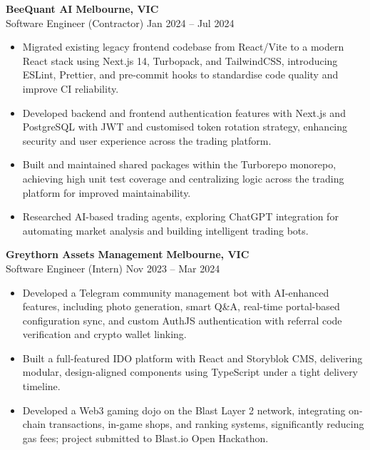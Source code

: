 \documentclass[11pt, letterpaper]{article}
\begin{document}
\noindent\scriptsize \textbf{BeeQuant AI} \hfill \textbf{Melbourne, VIC} \\
\scriptsize {Software Engineer (Contractor)} \hfill Jan 2024 -- Jul 2024
\vspace{-0.5em}
\begin{itemize}
    \setlength\itemsep{-0.2em}
    \setlength\leftskip{-2em}
    \setlength{}
    \setlength\itemindent{0em}  
	\item Migrated existing legacy frontend codebase from React/Vite to a modern React stack using Next.js 14, Turbopack, and TailwindCSS, introducing ESLint, Prettier, and pre-commit hooks to standardise code quality and improve CI reliability.
	\item Developed backend and frontend authentication features with Next.js and PostgreSQL with JWT and customised token rotation strategy, enhancing security and user experience across the trading platform.
	\item Built and maintained shared packages within the Turborepo monorepo, achieving high unit test coverage and centralizing logic across the trading platform for improved maintainability.
	\item Researched AI-based trading agents, exploring ChatGPT integration for automating market analysis and building intelligent trading bots.
\end{itemize}
\vspace{0.5em}

\noindent\scriptsize \textbf{Greythorn Assets Management} \hfill \textbf{Melbourne, VIC} \\
\scriptsize {Software Engineer (Intern)} \hfill Nov 2023 -- Mar 2024
\vspace{-0.5em}
\begin{itemize}
    \setlength\itemsep{-0.2em}
    \setlength\leftskip{-2em}
    \setlength{}
    \setlength\itemindent{0em}  
 	\item Developed a Telegram community management bot with AI-enhanced features, including photo generation, smart Q\&A, real-time portal-based configuration sync, and custom AuthJS authentication with referral code verification and crypto wallet linking.
    \item Built a full-featured IDO platform with React and Storyblok CMS, delivering modular, design-aligned components using TypeScript under a tight delivery timeline.    
    \item Developed a Web3 gaming dojo on the Blast Layer 2 network, integrating on-chain transactions, in-game shops, and ranking systems, significantly reducing gas fees; project submitted to Blast.io Open Hackathon.

\end{itemize}
\vspace{0.5em}
\end{document}
